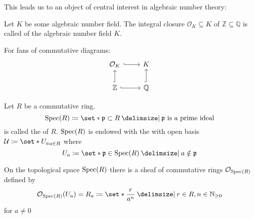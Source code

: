 This leads us to an object of central interest in algebraic number theory:

\begin{definition}
	Let $K$ be some algebraic number field.
	The integral closure $\mathcal{O}_K \subseteq K$ of $\mathbb{Z} \subseteq \mathbb{Q}$ is called  of the algebraic number field $K$.
\end{definition}

For fans of commutative diagrams:
\[
	\begin{tikzcd}
		\mathcal{O}_K \rar[hook] & K \\
		\mathbb{Z} \uar[hook] \rar[hook] & \mathbb{Q} \uar[hook]
	\end{tikzcd}
\]

\begin{definition}
	Let $R$ be a commutative ring.
	\[
		\Spec(R) \coloneqq \set*{\mathfrak{p} \subset R \given \mathfrak{p} \text{ is a prime ideal} }
	\]
	is called the  of $R$.
	$\operatorname{Spec}(R)$ is endowed with the  with open basis $\mathcal{U} \coloneqq \set*{U_a}_{a \in R}$ where
	\[
		U_a \coloneqq \set*{\mathfrak{p} \in \Spec(R) \given a \notin \mathfrak{p}}
	\]
\end{definition}

On the topological space $\operatorname{Spec}(R)$ there is a sheaf of commutative rings $\mathcal{O}_{\operatorname{Spec}(R)}$ defined by
\[
	\mathcal{O}_{\Spec(R)}(U_a) = R_a \coloneqq \set*{\frac{r}{a^n} \given r \in R, n \in \mathbb{N}_{\ge 0}}
\]
for $a \neq 0$



\cleardoubleoddemptypage
{}
\setcounter{page}{1}
\appendix
\printbibliography
\printindex
\todototoc
\listoftodos[To-do's]

